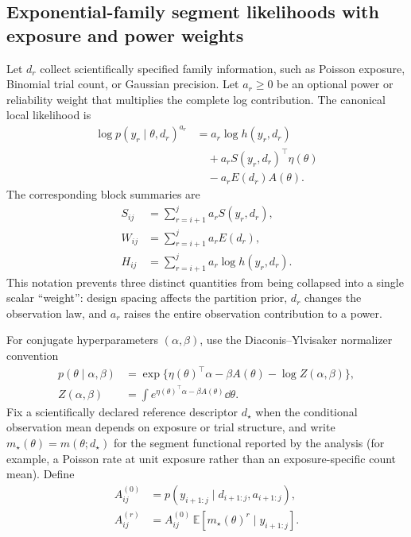 \subsection{Exponential-family segment likelihoods with exposure and power weights}
Let $d_r$ collect scientifically specified family information, such as Poisson exposure, Binomial trial count, or Gaussian precision. Let $a_r\ge0$ be an optional power or reliability weight that multiplies the complete log contribution. The canonical local likelihood is
\begin{equation}
\begin{aligned}
\log p(y_r\mid\theta,d_r)^{a_r}
&=a_r\log h(y_r,d_r)\\
&\quad+a_rS(y_r,d_r)^\top\eta(\theta)\\
&\quad-a_rE(d_r)A(\theta).
\end{aligned}
\label{eq:local-ef}
\end{equation}
The corresponding block summaries are
\begin{align}
S_{ij}&=\sum_{r=i+1}^{j}a_rS(y_r,d_r),\nonumber\\
W_{ij}&=\sum_{r=i+1}^{j}a_rE(d_r),\nonumber\\
H_{ij}&=\sum_{r=i+1}^{j}a_r\log h(y_r,d_r).
\label{eq:block-summaries}
\end{align}
This notation prevents three distinct quantities from being collapsed into a single scalar ``weight'': design spacing affects the partition prior, $d_r$ changes the observation law, and $a_r$ raises the entire observation contribution to a power.

For conjugate hyperparameters $(\alpha,\beta)$, use the Diaconis--Ylvisaker normalizer convention
\begin{align}
p(\theta\mid\alpha,\beta)
&=\exp\{\eta(\theta)^\top\alpha-\beta A(\theta)-\log Z(\alpha,\beta)\},\nonumber\\
Z(\alpha,\beta)
&=\int e^{\eta(\theta)^\top\alpha-\beta A(\theta)}\dd\theta.
\label{eq:conjugate-prior}
\end{align}
Fix a scientifically declared reference descriptor $d_\star$ when the conditional observation mean depends on exposure or trial structure, and write $m_\star(\theta)=m(\theta;d_\star)$ for the segment functional reported by the analysis (for example, a Poisson rate at unit exposure rather than an exposure-specific count mean). Define
\begin{align*}
A^{(0)}_{ij}&=p(y_{i+1:j}\mid d_{i+1:j},a_{i+1:j}),\\
A^{(r)}_{ij}&=A^{(0)}_{ij}\,\mathbb E[m_\star(\theta)^r\mid y_{i+1:j}].
\end{align*}

